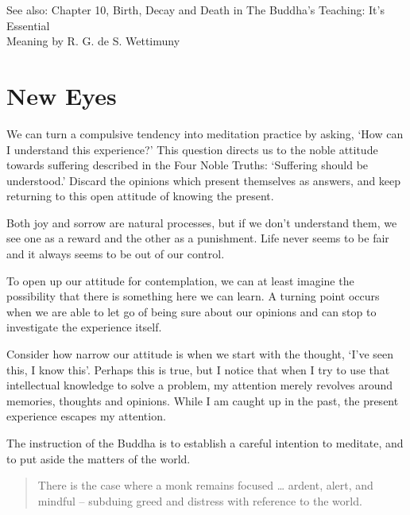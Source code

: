 {\noindent\footnotesize
See also: Chapter 10, Birth, Decay and Death in The Buddha's Teaching: It's Essential\\ Meaning by R. G. de S. Wettimuny
\par}


\clearpage
\normalpagelayout

\section{New Eyes}


\noindent We can turn a compulsive tendency into meditation practice by
asking, `How can I understand this experience?' This question directs us
to the noble attitude towards suffering described in the Four Noble
Truths: `Suffering should be understood.' Discard the opinions which
present themselves as answers, and keep returning to this open attitude
of knowing the present.

Both joy and sorrow are natural processes, but if we don't understand
them, we see one as a reward and the other as a punishment. Life never
seems to be fair and it always seems to be out of our control.

To open up our attitude for contemplation, we can at least imagine the
possibility that there is something here we can learn. A turning point
occurs when we are able to let go of being sure about our opinions and
can stop to investigate the experience itself.

Consider how narrow our attitude is when we start with the thought,
`I've seen this, I know this'. Perhaps this is true, but I notice that
when I try to use that intellectual knowledge to solve a problem, my
attention merely revolves around memories, thoughts and opinions. While
I am caught up in the past, the present experience escapes my attention.

The instruction of the Buddha is to establish a careful intention to
meditate, and to put aside the matters of the world.

\clearpage

\begin{quote}
There is the case where a monk remains focused \ldots{} ardent, alert,
and mindful -- subduing greed and distress with reference to the world.

\bigskip

\end{quote}

